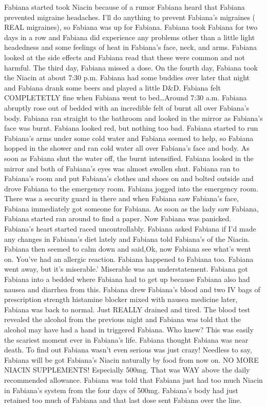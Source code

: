 \documentclass[12pt]{book}
\begin{document}
Fabiana started took Niacin because of a rumor Fabiana heard that Fabiana prevented migraine headaches. I'll do anything to prevent Fabiana's migraines ( REAL migraines), so Fabiana was up for Fabiana. Fabiana took Fabiana for two days in a row and Fabiana did experience any problems other than a little light headedness and some feelings of heat in Fabiana's face, neck, and arms. Fabiana looked at the side effects and Fabiana read that these were common and not harmful. The third day, Fabiana missed a dose. On the fourth day, Fabiana took the Niacin at about 7:30 p.m. Fabiana had some buddies over later that night and Fabiana drank some beers and played a little D\&D. Fabiana felt COMPLETETLY fine when Fabiana went to bed\ldots Around 7:30 a.m. Fabiana abruptly rose out of bedded with an incredible felt of burnt all over Fabiana's body. Fabiana ran straight to the bathroom and looked in the mirror as Fabiana's face was burnt. Fabiana looked red, but nothing too bad. Fabiana started to run Fabiana's arms under some cold water and Fabiana seemed to help, so Fabiana hopped in the shower and ran cold water all over Fabiana's face and body. As soon as Fabiana shut the water off, the burnt intensified. Fabiana looked in the mirror and both of Fabiana's eyes was almost swollen shut. Fabiana ran to Fabiana's room and put Fabiana's clothes and shoes on and bolted outside and drove Fabiana to the emergency room. Fabiana jogged into the emergency room. There was a security guard in there and when Fabiana saw Fabiana's face, Fabiana immediately got someone for Fabiana. As soon as the lady saw Fabiana, Fabiana started ran around to find a paper. Now Fabiana was panicked. Fabiana's heart started raced uncontrollably. Fabiana asked Fabiana if I'd made any changes in Fabiana's diet lately and Fabiana told Fabiana's of the Niacin. Fabiana then seemed to calm down and said,Ok, now Fabiana see what's went on. You've had an allergic reaction. Fabiana happened to Fabiana too. Fabiana went away, but it's miserable.' Miserable was an understatement. Fabiana got Fabiana into a bedded where Fabiana had to get up because Fabiana also had nausea and diarrhea from this. Fabiana drew Fabiana's blood and two IV bags of prescription strength histamine blocker mixed with nausea medicine later, Fabiana was back to normal. Just REALLY drained and tired. The blood test revealed the alcohol from the previous night and Fabiana was told that the alcohol may have had a hand in triggered Fabiana. Who knew? This was easily the scariest moment ever in Fabiana's life. Fabiana thought Fabiana was near death. To find out Fabiana wasn't even serious was just crazy! Needless to say, Fabiana will be got Fabiana's Niacin naturally by food from now on. NO MORE NIACIN SUPPLEMENTS! Especially 500mg. That was WAY above the daily recommended allowance. Fabiana was told that Fabiana just had too much Niacin in Fabiana's system from the four days of 500mg. Fabiana's body had just retained too much of Fabiana and that last dose sent Fabiana over the line.
\end{document}
